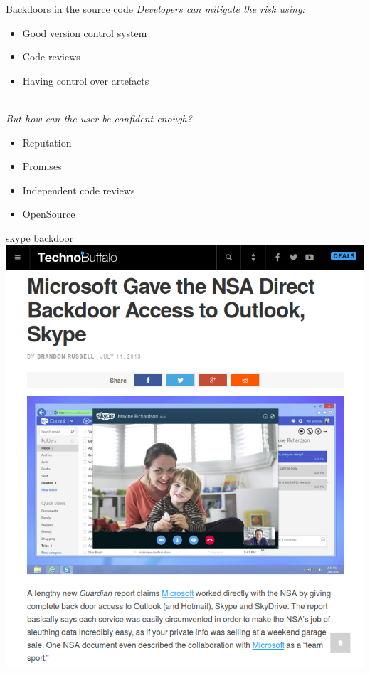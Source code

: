 \documentclass[11pt]{beamer}
\begin{document}
\begin{frame}{Backdoors in the source code}
\emph{Developers can mitigate the risk using:}
\begin{itemize}
\item Good version control system
\item Code reviews
\item Having control over artefacts %
\end{itemize}
\\[0.2cm]
\pause
\emph{But how can the user be confident enough?}
\begin{itemize}
\item Reputation                    %
\item Promises                      %
\item Independent code reviews      %
\item OpenSource                    %
\end{itemize}
\end{frame}

\begin{frame}{skype backdoor}
\includegraphics[scale=0.27]{skype.png}
\end{frame}
\end{document}
